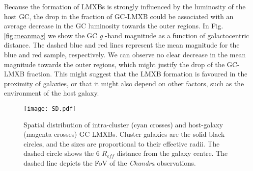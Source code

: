\documentclass{aa}
\begin{document}
Because the formation of LMXBs is strongly influenced by the luminosity of the host GC, the drop in the fraction of GC-LMXB could be associated with an average decrease in the GC luminosity towards the outer regions. In Fig. \ref{fig:meanmag} we show the GC \textit{g} -band magnitude as a function of galactocentric distance. The dashed blue and red lines represent the mean magnitude for the blue and red sample, respectively. We can observe no clear decrease in the mean magnitude towards the outer regions, which might justify the drop of the GC-LMXB fraction. This might suggest that the LMXB formation is favoured in the proximity of galaxies, or that it might also depend on other factors, such as the environment of the host galaxy.






\begin{figure*}
    \centering
    \texttt{[image: SD.pdf]}
    \caption{Spatial distribution of intra-cluster (cyan crosses) and host-galaxy (magenta crosses) GC-LMXBs. Cluster galaxies are the solid black circles, and the sizes are proportional to their effective radii. The dashed circle shows the 6 $R_{eff}$ distance from the galaxy centre. The dashed line depicts the FoV of the \textit{Chandra} observations.}
    \label{fig:SD}
\end{figure*}
\end{document}
